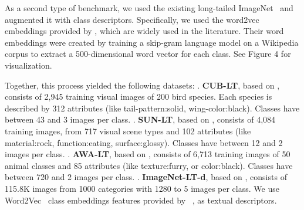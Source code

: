 \documentclass[10pt,twocolumn,letterpaper]{article}
\begin{document}
\begin{table}[t!]
    \centering
    \caption{Properties of CUB-LT, SUN-LT and AWA-LT.}
    \label{table:train-splits}
\end{table}

As a second type of benchmark, we used the existing long-tailed ImageNet~\cite{openlongtailrecognition} and augmented it with class descriptors. Specifically, we used the word2vec embeddings provided by \cite{SYNC}, which are widely used in the literature. 
Their word embeddings were created by training a skip-gram language model on a Wikipedia corpus to extract a 500-dimensional word vector for each class. See \cite{SYNC} Figure 4 for visualization.

Together, this process yielded the following datasets:
. \textbf{CUB-LT}, based on \cite{CUB},  consists of 2,945 training visual images of 200 bird species. Each species is described by 312 attributes (like tail-pattern:solid, wing-color:black). Classes have between 43 and 3 images per class. 
. \textbf{SUN-LT}, based on \cite{SUN}, consists of 4,084 training images, from 717 visual scene types and 102 attributes (like material:rock, function:eating, surface:glossy).
Classes have between 12 and 2 images per class.
. \textbf{AWA-LT}, based on \cite{DAP}, consists of 6,713 training images of 50 animal classes and 85 attributes (like texture:furry, or color:black).
Classes have between 720 and 2 images per class.
. \textbf{ImageNet-LT-d}, based on \cite{openlongtailrecognition}, consists of 115.8K images from 1000 categories with 1280 to 5 images per class. We use Word2Vec~\cite{Mikolov2013DistributedRO} class embeddings features provided by ~\cite{SYNC}, as textual descriptors.
\end{document}

